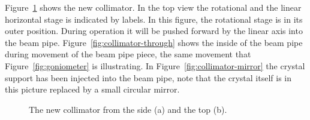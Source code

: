 Figure~\ref{fig:collimator} shows the new collimator. In the top view the rotational and the linear horizontal stage is indicated by labels. In this figure, the rotational stage is in its outer position. During operation it will be pushed forward by the linear axis into the beam pipe. Figure~\ref{fig:collimator-through} shows the inside of the beam pipe during movement of the beam pipe piece, the same movement that Figure~\ref{fig:goniometer} is illustrating. In Figure~\ref{fig:collimator-mirror} the crystal support has been injected into the beam pipe, note that the crystal itself is in this picture replaced by a small circular mirror.

\begin{figure}[tpb]
  \centering %
  \qquad
  \caption{\label{fig:collimator} The new collimator from the side (a) and the top (b).}
\end{figure}

